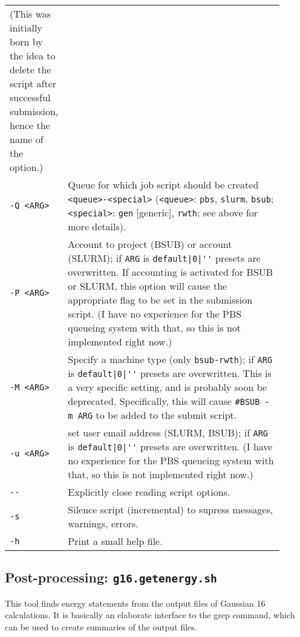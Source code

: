 \documentclass[   %
  final,          %
  a4paper         %
]{article}
\begin{document}
\begin{longtable}{p{0.1\linewidth}p{0.8\linewidth}}
    (This was initially born by the idea to delete the script after successful submission, hence the name of the option.)  \\
  {\lstinline`-Q <ARG>`} & Queue for which job script should be created {\lstinline`<queue>-<special>`} %
    ({\lstinline`<queue>`}: {\lstinline`pbs`}, {\lstinline`slurm`}, {\lstinline`bsub`}; %
     {\lstinline`<special>`}: {\lstinline`gen`} [generic], {\lstinline`rwth`}; see above for more details). \\
  {\lstinline`-P <ARG>`} & Account to project (BSUB) or account (SLURM); %
    if {\lstinline`ARG`} is {\lstinline`default|0|''`} presets are overwritten. 
    If accounting is activated for BSUB or SLURM, this option will cause the appropriate flag to be set in the submission script.
    (I have no experience for the PBS queueing system with that, so this is not implemented right now.)\\
  {\lstinline`-M <ARG>`} & Specify a machine type (only {\lstinline`bsub-rwth`}); %
    if {\lstinline`ARG`} is {\lstinline`default|0|''`} presets are overwritten. 
    This is a very specific setting, and is probably soon be deprecated.
    Specifically, this will cause \texttt{\#BSUB -m {\lstinline`ARG`}} to be added to the submit script. \\
  {\lstinline`-u <ARG>`} & set user email address (SLURM, BSUB); %
    if {\lstinline`ARG`} is {\lstinline`default|0|''`} presets are overwritten. 
    (I have no experience for the PBS queueing system with that, so this is not implemented right now.)\\
  {\lstinline`--`}       & Explicitly close reading script options. \\
  {\lstinline`-s`}       & Silence script (incremental) to supress messages, warnings, errors. \\
  {\lstinline`-h`}       & Print a small help file. \\
\end{longtable}

\subsection{Post-processing: \texorpdfstring{{\lstinline`g16.getenergy.sh`}}{g16.getenergy.sh}}

This tool finds energy statements from the output files of Gaussian 16 calculations.
It is basically an elaborate interface to the grep command, 
which can be used to create summaries of the output files.
\end{document}
